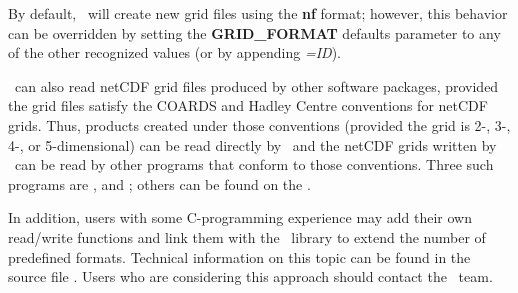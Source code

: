 By default, \GMT\ will create new grid files using the \textbf{nf} format; however,
this behavior can be overridden by setting the \textbf{GRID\_FORMAT} defaults parameter
to any of the other recognized values (or by appending \emph{=ID}).

\GMT\ can also read netCDF grid files produced by other software packages, provided the grid files
satisfy the COARDS and Hadley Centre conventions for netCDF grids. Thus, products created under
those conventions (provided the grid is 2-, 3-, 4-, or 5-dimensional) can be read directly by \GMT\ and the netCDF grids
written by \GMT\ can be read by other programs that conform to those conventions. Three such programs are
,
and
; others can be found
on the .

In addition, users with some C-programming experience may add
their own read/write functions and link them with the \GMT\ library
to extend the number of predefined formats.  Technical information
on this topic can be found in the source file .
Users who are considering this approach should contact the \GMT\ team.

